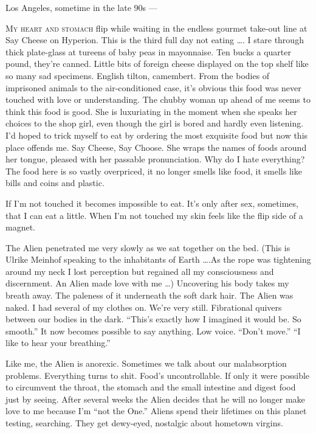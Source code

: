 \documentclass[
]{memoir}
\begin{document}
Los Angeles, sometime in the late 90s ---

\lettrine[lines=3, findent=0em, nindent=0.1em, lhang=0]{M}{y heart and stomach}
flip while waiting in the endless gourmet take-out line at Say Cheese on
Hyperion. This is the third full day not eating \ldots{}. I stare
through thick plate-glass at tureens of baby peas in mayonnaise. Ten
bucks a quarter pound, they're canned. Little bits of foreign cheese
displayed on the top shelf like so many sad specimens. English tilton,
camembert. From the bodies of imprisoned animals to the air-conditioned
case, it's obvious this food was never touched with love or
understanding. The chubby woman up ahead of me seems to think this food
is good. She is luxuriating in the moment when she speaks her choices to
the shop girl, even though the girl is bored and hardly even listening.
I'd hoped to trick myself to eat by ordering the most exquisite food but
now this place offends me. Say Cheese, Say Choose. She wraps the names
of foods around her tongue, pleased with her passable pronunciation. Why
do I hate everything? The food here is so vastly overpriced, it no
longer smells like food, it smells like bills and coins and plastic.

If I'm not touched it becomes impossible to eat. It's only after sex,
sometimes, that I can eat a little. When I'm not touched my skin feels
like the flip side of a magnet.

The Alien penetrated me very slowly as we sat together on the bed. (This
is Ulrike Meinhof speaking to the inhabitants of Earth \ldots{}.As the
rope was tightening around my neck I lost perception but regained all my
consciousness and discernment. An Alien made love with me \ldots{})
Uncovering his body takes my breath away. The paleness of it underneath
the soft dark hair. The Alien was naked. I had several of my clothes on.
We're very still. Fibrational quivers between our bodies in the dark.
``This's exactly how I imagined it would be. So smooth.'' It now becomes
possible to say anything. Low voice. ``Don't move.'' ``I like to hear
your breathing.''

Like me, the Alien is anorexic. Sometimes we talk about our
malabsorption problems. Everything turns to shit. Food's uncontrollable.
If only it were possible to circumvent the throat, the stomach and the
small intestine and digest food just by seeing. After several weeks the
Alien decides that he will no longer make love to me because I'm ``not
the One.'' Aliens spend their lifetimes on this planet testing,
searching. They get dewy-eyed, nostalgic about hometown virgins.
\end{document}
